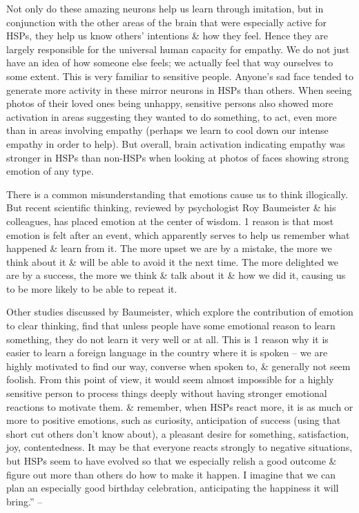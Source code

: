 \documentclass{article}
\numberwithin{equation}{section}
\begin{document}
Not only do these amazing neurons help us learn through imitation, but in conjunction with the other areas of the brain that were especially active for HSPs, they help us know others' intentions \& how they feel. Hence they are largely responsible for the universal human capacity for empathy. We do not just have an idea of how someone else feels; we actually feel that way ourselves to some extent. This is very familiar to sensitive people. Anyone's sad face tended to generate more activity in these mirror neurons in HSPs than others. When seeing photos of their loved ones being unhappy, sensitive persons also showed more activation in areas suggesting they wanted to do something, to act, even more than in areas involving empathy (perhaps we learn to cool down our intense empathy in order to help). But overall, brain activation indicating empathy was stronger in HSPs than non-HSPs when looking at photos of faces showing strong emotion of any type.

There is a common misunderstanding that emotions cause us to think illogically. But recent scientific thinking, reviewed by psychologist Roy Baumeister \& his colleagues, has placed emotion at the center of wisdom. 1 reason is that most emotion is felt after an event, which apparently serves to help us remember what happened \& learn from it. The more upset we are by a mistake, the more we think about it \& will be able to avoid it the next time. The more delighted we are by a success, the more we think \& talk about it \& how we did it, causing us to be more likely to be able to repeat it.

Other studies discussed by Baumeister, which explore the contribution of emotion to clear thinking, find that unless people have some emotional reason to learn something, they do not learn it very well or at all. This is 1 reason why it is easier to learn a foreign language in the country where it is spoken -- we are highly motivated to find our way, converse when spoken to, \& generally not seem foolish. From this point of view, it would seem almost impossible for a highly sensitive person to process things deeply without having stronger emotional reactions to motivate them. \& remember, when HSPs react more, it is as much or more to positive emotions, such as curiosity, anticipation of success (using that short cut others don't know about), a pleasant desire for something, satisfaction, joy, contentedness. It may be that everyone reacts strongly to negative situations, but HSPs seem to have evolved so that we especially relish a good outcome \& figure out more than others do how to make it happen. I imagine that we can plan an especially good birthday celebration, anticipating the happiness it will bring.'' -- \cite[pp. 21--23]{Aron2013}
\end{document}
